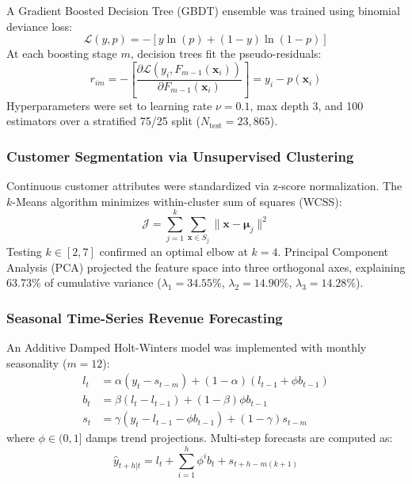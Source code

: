 \documentclass[conference]{IEEEtran}
\begin{document}
A Gradient Boosted Decision Tree (GBDT) ensemble  was trained using binomial deviance loss:
\begin{equation}
\mathcal{L}(y, p) = - [y \ln(p) + (1 - y) \ln(1 - p)]
\end{equation}
At each boosting stage $m$, decision trees fit the pseudo-residuals:
\begin{equation}
r_{im} = -\left[\frac{\partial \mathcal{L}(y_i, F_{m-1}(\mathbf{x}_i))}{\partial F_{m-1}(\mathbf{x}_i)}\right] = y_i - p(\mathbf{x}_i)
\end{equation}
Hyperparameters were set to learning rate $\nu = 0.1$, max depth 3, and 100 estimators over a stratified 75/25 split ($N_{\text{test}} = 23,865$).

\subsubsection{Customer Segmentation via Unsupervised Clustering}
Continuous customer attributes were standardized via z-score normalization. The $k$-Means algorithm  minimizes within-cluster sum of squares (WCSS):
\begin{equation}
\mathcal{J} = \sum_{j=1}^{k} \sum_{\mathbf{x} \in S_j} \|\mathbf{x} - \boldsymbol{\mu}_j\|^2
\end{equation}
Testing $k \in [2, 7]$ confirmed an optimal elbow at $k=4$. Principal Component Analysis (PCA) projected the feature space into three orthogonal axes, explaining 63.73\% of cumulative variance ($\lambda_1 = 34.55\%$, $\lambda_2 = 14.90\%$, $\lambda_3 = 14.28\%$).

\subsubsection{Seasonal Time-Series Revenue Forecasting}
An Additive Damped Holt-Winters model  was implemented with monthly seasonality ($m=12$):
\begin{align}
l_t &= \alpha(y_t - s_{t-m}) + (1 - \alpha)(l_{t-1} + \phi b_{t-1}) \\
b_t &= \beta(l_t - l_{t-1}) + (1 - \beta)\phi b_{t-1} \\
s_t &= \gamma(y_t - l_{t-1} - \phi b_{t-1}) + (1 - \gamma)s_{t-m}
\end{align}
where $\phi \in (0, 1]$ damps trend projections. Multi-step forecasts are computed as:
\begin{equation}
\hat{y}_{t+h|t} = l_t + \sum_{i=1}^h \phi^i b_t + s_{t+h-m(k+1)}
\end{equation}
\end{document}
